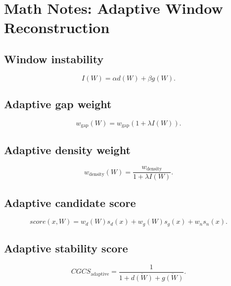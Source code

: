 \documentclass{article}
\begin{document}
\section*{Math Notes: Adaptive Window Reconstruction}

\subsection*{Window instability}
\[
I(W)=\alpha d(W)+\beta g(W).
\]

\subsection*{Adaptive gap weight}
\[
w_{\mathrm{gap}}(W)=w_{\mathrm{gap}}\left(1+\lambda I(W)\right).
\]

\subsection*{Adaptive density weight}
\[
w_{\mathrm{density}}(W)=\frac{w_{\mathrm{density}}}{1+\lambda I(W)}.
\]

\subsection*{Adaptive candidate score}
\[
score(x,W)=
w_d(W)s_d(x)+w_g(W)s_g(x)+w_n s_n(x).
\]

\subsection*{Adaptive stability score}
\[
CGCS_{\mathrm{adaptive}}=
\frac{1}{1+\overline{d(W)}+\overline{g(W)}}.
\]
\end{document}
